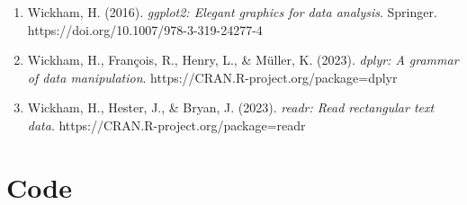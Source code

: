 \documentclass[
  twocolumn]{biophys-new-mod}
\begin{document}
\begin{enumerate}
{  statistical computing}. R Foundation for Statistical Computing.
  https://www.R-project.org/
\item
  Wickham, H. (2016). \emph{ggplot2: Elegant graphics for data
  analysis}. Springer. https://doi.org/10.1007/978-3-319-24277-4
\item
  Wickham, H., François, R., Henry, L., \& Müller, K. (2023).
  \emph{dplyr: A grammar of data manipulation}.
  https://CRAN.R-project.org/package=dplyr
\item
  Wickham, H., Hester, J., \& Bryan, J. (2023). \emph{readr: Read
  rectangular text data}. https://CRAN.R-project.org/package=readr
\end{enumerate}

\clearpage
\onecolumn

\section{Code}\label{code}
\end{document}
